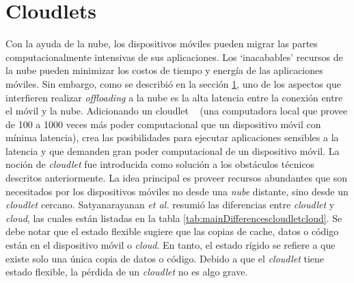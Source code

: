 
\chapter{Cloudlets} %

\label{ch:Chapter4} %



Con la ayuda de la nube, los dispositivos móviles pueden migrar las partes computacionalmente intensivas de sus aplicaciones. Los `inacabables' 
recursos de la nube pueden minimizar los costos de tiempo y energía de las aplicaciones móviles. Sin embargo, como se describió en la sección
\ref{ch:Chapter4}, uno de los aspectos que interfieren realizar \textit{offloading} a la nube es la alta latencia entre la conexión entre el móvil 
y la nube. Adicionando un cloudlet ~\cite{5280678} (una computadora local que provee de 100 a 1000 veces más poder computacional que un dispositivo móvil con 
mínima latencia), crea las posibilidades para ejecutar aplicaciones sensibles a la latencia y que demanden gran poder computacional de un dispositivo
móvil. La noción de \textit{cloudlet} fue introducida como solución a los obstáculos técnicos descritos anteriormente. La idea 
principal es proveer recursos abundantes que son necesitados por los dispositivos móviles no desde una \textit{nube} distante, sino desde
un \textit{cloudlet} cercano. Satyanarayanan \textit{et al.} resumió las diferencias entre \textit{cloudlet} y \textit{cloud}, las cuales están
listadas en la tabla \ref{tab:mainDifferencescloudletcloud}. Se debe notar que el estado flexible sugiere que las copias de cache, datos 
o código están en el dispositivo móvil o \textit{cloud}. En tanto, el estado rígido se refiere a que existe solo una única copia de 
datos o código. Debido a que el \textit{cloudlet} tiene estado flexible, la pérdida de un \textit{cloudlet} no es algo grave. 

